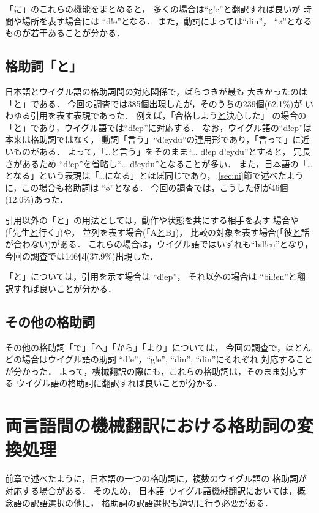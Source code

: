 「に」のこれらの機能をまとめると，
多くの場合は``g!e''と翻訳すれば良いが
時間や場所を表す場合には ``d!e''となる．
また，動詞によっては``din''， ``\o''となるものが若干あることが分かる．

\subsection{格助詞「と」}
\label{sec:to}
日本語とウイグル語の格助詞間の対応関係で，ばらつきが最も
大きかったのは「と」である．
今回の調査では385個出現したが，そのうちの239個(62.1\%)が
いわゆる引用を表す表現であった．
例えば，「合格しよう\underline{と}決心した」
の場合の「と」であり，ウイグル語では``d!ep''に対応する．
なお，ウイグル語の``d!ep''は本来は格助詞ではなく，
動詞「言う」``d!eydu''の連用形であり，「言って」に近いものがある．
よって，「…と言う」をそのまま``… d!ep d!eydu''とすると，
冗長さがあるため ``d!ep''を省略し``… d!eydu''となることが多い．
また，日本語の「…となる」という表現は「…になる」とほぼ同じであり，
\ref{sec:ni}節で述べたように，この場合も格助詞は ``\o''となる．
今回の調査では，こうした例が46個(12.0\%)あった．

引用以外の「と」の用法としては，動作や状態を共にする相手を表す
場合や(「先生\underline{と}行く」)や，
並列を表す場合(「A\underline{と}B」)，
比較の対象を表す場合(「彼\underline{と}話が合わない)がある．
これらの場合は，ウイグル語ではいずれも``bil!en''となり，
今回の調査では146個(37.9\%)出現した．

「と」については，引用を示す場合は ``d!ep''，
それ以外の場合は ``bil!en''と翻訳すれば良いことが分かる．

\subsection{その他の格助詞}
その他の格助詞「で」「へ」「から」「より」については，
今回の調査で，ほとんどの場合はウイグル語の助詞 
 ``d!e''，``g!e'', ``din'', ``din''にそれぞれ
対応することが分かった．
よって，機械翻訳の際にも，これらの格助詞は，そのまま対応する
ウイグル語の格助詞に翻訳すれば良いことが分かる．

\section{両言語間の機械翻訳における格助詞の変換処理} \label{trans}
前章で述べたように，日本語の一つの格助詞に，複数のウイグル語の
格助詞が対応する場合がある．
そのため，
日本語--ウイグル語機械翻訳においては，概念語の訳語選択の他に，
格助詞の訳語選択も適切に行う必要がある．

